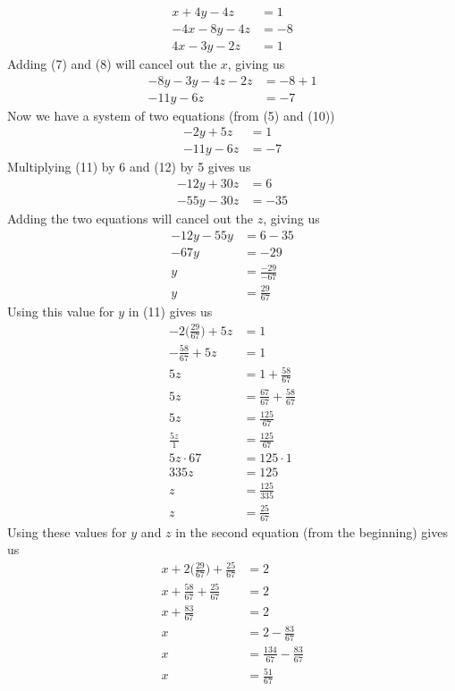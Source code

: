 \documentclass[12pt]{article}
\begin{document}
\begin{align}
x+4y-4z&=1 \\
-4x-8y-4z&=-8 \\
4x-3y-2z&=1
\end{align}
Adding (7) and (8) will cancel out the $x$, giving us
\begin{align}
-8y-3y-4z-2z&=-8+1 \\
-11y-6z&=-7
\end{align}
Now we have a system of two equations (from (5) and (10))
\begin{align}
-2y+5z&=1 \\
-11y-6z&=-7
\end{align}
Multiplying (11) by 6 and (12) by 5 gives us
\begin{align*}
-12y+30z&=6 \\
-55y-30z&=-35
\end{align*}
Adding the two equations will cancel out the $z$, giving us
\begin{align*}
-12y-55y&=6-35 \\
-67y&=-29 \\
y&=\displaystyle \frac{-29}{-67} \\
y&=\displaystyle \frac{29}{67}
\end{align*}
Using this value for $y$ in (11) gives us
\begin{align*}
-2\bigg(\displaystyle \frac{29}{67}\bigg)+5z&=1 \\
-\displaystyle \frac{58}{67}+5z&=1 \\
5z&=1+\displaystyle \frac{58}{67} \\
5z&=\displaystyle \frac{67}{67}+\displaystyle \frac{58}{67} \\
5z&=\displaystyle \frac{125}{67} \\
\displaystyle \frac{5z}{1}&=\displaystyle \frac{125}{67} \\
5z\cdot67&=125\cdot1 \\
335z&=125 \\
z&=\displaystyle \frac{125}{335} \\
z&=\displaystyle \frac{25}{67}
\end{align*}
Using these values for $y$ and $z$ in the second equation (from the beginning) gives us
\begin{align*}
x+2\bigg(\displaystyle \frac{29}{67}\bigg)+\displaystyle \frac{25}{67}&=2 \\
x+\displaystyle \frac{58}{67}+\displaystyle \frac{25}{67}&=2 \\
x+\displaystyle \frac{83}{67}&=2 \\
x&=2-\displaystyle \frac{83}{67} \\
x&=\displaystyle \frac{134}{67}-\displaystyle \frac{83}{67} \\
x&=\displaystyle \frac{51}{67}
\end{align*}
\end{document}

